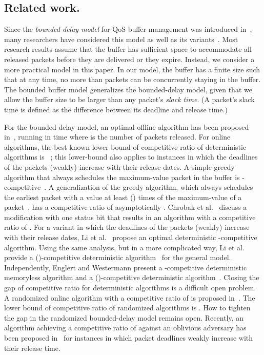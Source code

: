 \documentclass[final, 11pt]{article}
\begin{document}
\subsection{Related work.}

Since the {\em bounded-delay model} for QoS buffer management was introduced in~\cite{KLMPSS04, H01}, many researchers have considered this model as well as its variants~\cite{KLMPSS04, H01, CF03, CCFJST06, CJST07, LSS05, LSS07, EW07}. Most research results assume that the buffer has sufficient space to accommodate all released packets before they are delivered or they expire. Instead, we consider a more practical model in this paper. In our model, the buffer has a finite size  such that at any time, no more than  packets can be concurrently staying in the buffer. The bounded buffer model generalizes the bounded-delay model, given that we allow the buffer size  to be larger than any packet's {\em slack time}. (A packet's slack time is defined as the difference between its deadline and release time.)

For the bounded-delay model, an optimal offline algorithm has been proposed in~\cite{KLMPSS04}, running in  time where  is the number of packets released. For online algorithms, the best known lower bound of competitive ratio of deterministic algorithms is ~\cite{H01, CF03, AMZ03}; this lower-bound also applies to instances in which the deadlines of the packets (weakly) increase with their release dates. A simple greedy algorithm that always schedules the maximum-value packet in the buffer is -competitive~\cite{H01, KLMPSS04}.  A generalization of the greedy algorithm, which always schedules the earliest packet with a value at least  () times of the maximum-value of a packet~\cite{CCFJST06}, has a competitive ratio of asymptotically .  Chrobak et al.~\cite{CJST07} discuss a modification with one status bit that results in an algorithm with a competitive ratio of . For a variant in which the deadlines of the packets (weakly) increase with their release dates, Li et al.~\cite{LSS05} propose an optimal deterministic -competitive algorithm. Using the same analysis, but in a more complicated way, Li et al. provide a ()-competitive deterministic algorithm~\cite{LSS05} for the general model. Independently, Englert and Westermann present a -competitive deterministic memoryless algorithm and a ()-competitive deterministic algorithm~\cite{EW07}. Closing the gap  of competitive ratio for deterministic algorithms is a difficult open problem. A randomized online algorithm with a competitive ratio of  is proposed in~\cite{CCFJST06}. The lower bound of competitive ratio of randomized algorithms is . How to tighten the gap  in the randomized bounded-delay model remains open. Recently, an algorithm achieving a competitive ratio of  against an oblivious adversary has been proposed in~\cite{JLSS09} for instances in which packet deadlines weakly increase with their release time.
\end{document}
